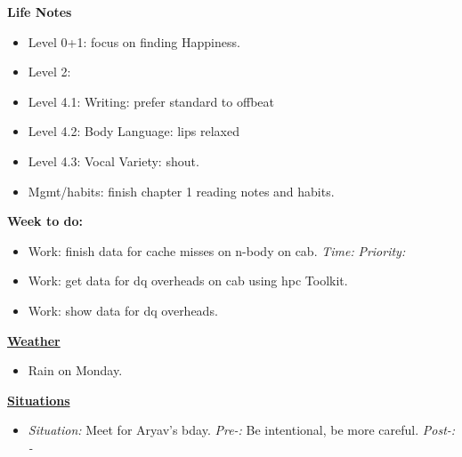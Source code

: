 \documentclass[11pt]{article}
\newcommand{\timeEst}[1]{\textit{Time:} \textit{#1}}
\newcommand{\priority}[1]{\textit{Priority:} \textit{#1}}
\newcommand{\deadline}[1]{#1}
\begin{document}
{            %
            \textbf{Life Notes}
            \begin{itemize}
              \tiny \item \tiny Level 0+1: focus on finding Happiness.
            \item \tiny Level 2:
            \item \tiny Level 4.1: Writing: prefer standard to offbeat
            \item \tiny Level 4.2: Body Language: lips relaxed
            \item \tiny Level 4.3: Vocal Variety: shout.
            \item \tiny Mgmt/habits: finish chapter 1 reading notes and habits.
            \end{itemize} 
\newpage
\textbf{Week to do:} 
\begin{itemize}
  \tiny \item \tiny Work: finish data for cache misses on n-body on cab. \deadline{ }  \timeEst{}  \priority{}
  \tiny \item \tiny Work: get data for dq overheads on cab using hpc Toolkit.
  \tiny \item \tiny Work: show data for dq overheads.
\end{itemize} 
\newpage 

\textbf{\small \underline{Weather}} 
\begin{itemize}
\tiny \item \tiny Rain on Monday. 
\end{itemize}


\textbf{\small \underline{Situations}} \\
\begin{itemize}
  \tiny \item \tiny \textit{Situation:} Meet for Aryav's bday.  \textit{Pre-:} Be intentional, be more careful. \textit{Post-: - }
\end{itemize} 

}
\end{document}
